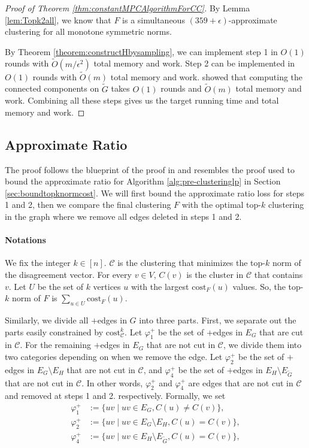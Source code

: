 \documentclass[11pt]{article}
\newcommand{\cost}{\mathrm{cost}}
\newcommand{\calC}{{\mathcal{C}}}
\begin{document}
\begin{CJK*}{UTF8}{gbsn}
\begin{proof}[Proof of Theorem \ref{thm:constantMPCAlgorithmForCC}]
By Lemma \ref{lem:Topk2all}, we know that $F$ is a simultaneous $(359 + \epsilon)$-approximate clustering for all monotone symmetric norms.

By Theorem \ref{theorem:constructHbysampling}, we can implement step 1 in $O(1)$ rounds with $\tilde{O}(m /\epsilon^2)$ total memory and work. Step 2 can be implemented in $O(1)$ rounds with $\tilde{O}(m)$ total memory and work. \cite{cohen2021correlation} showed that computing the connected components on $\tilde{G}$ takes $O(1)$ rounds and $\tilde{O}(m)$ total memory and work. Combining all these steps gives us the target running time and total memory and work.
\end{proof}


\subsection{Approximate Ratio}
The proof follows the blueprint of the proof in \cite{cohen2021correlation} and resembles the proof used to bound the approximate ratio for Algorithm \ref{alg:pre-clusteringlp} in Section \ref{sec:boundtopknormcost}. We will first bound the approximate ratio loss for steps 1 and 2, then we compare the final clustering $F$ with the optimal top-$k$ clustering in the graph where we remove all edges deleted in steps 1 and 2.



\paragraph{Notations} 
We fix the integer $k \in [n]$. $\mathcal{C}$ is the clustering that minimizes the top-$k$ norm of the disagreement vector.  For every $v \in V$, $C(v)$ is the cluster in $\calC$ that contains $v$. Let $U$ be the set of $k$ vertices $u$ with the largest $\cost_F(u)$ values. So, the top-$k$ norm of $F$ is $\sum_{u \in U}\cost_F(u)$.




 Similarly, we divide all $+$edges in $G$ into three parts. First, we separate out the parts easily constrained by $\cost^k_\calC$. Let $\varphi^+_1$ be the set of $+$edges in $E_G$ that are cut in $\calC$. For the remaining $+$edges in $E_G$ that are not cut in $\calC$, we divide them into two categories depending on when we remove the edge. Let $\varphi^+_2$ be the set of $+$edges in $E_G\setminus E_H$ that are not cut in $\calC$, and $\varphi^+_4$ be the set of $+$edges in $E_H\setminus E_{\tilde{G}}$ that are not cut in $\calC$. In other words,  $\varphi^+_2$ and $\varphi^+_4$ are edges that are not cut in $\calC$ and removed at steps 1 and 2. respectively. Formally, we set 
\begin{align*}
    \varphi^+_1 &:= \{uv \mid uv \in E_G, C(u) \not= C(v) \},\\
    \varphi^+_2 &:= \{uv \mid uv \in E_G \setminus E_H, C(u) = C(v) \},   \\
    \varphi^+_4 &:= \{uv \mid uv \in E_H \setminus E_{\tilde{G}}, C(u) = C(v) \}, \\
\end{align*} 


\end{CJK*}
\end{document}
